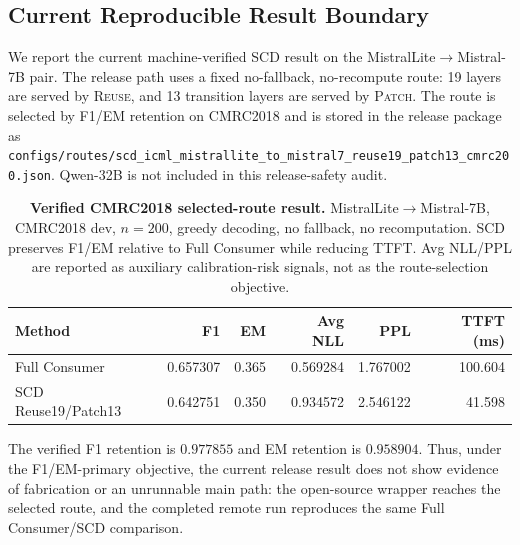
\subsection{Current Reproducible Result Boundary}
\label{subsec:current_repro_boundary}

We report the current machine-verified SCD result on the MistralLite$\to$Mistral-7B
pair.  The release path uses a fixed no-fallback, no-recompute route: 19 layers
are served by \textsc{Reuse}, and 13 transition layers are served by
\textsc{Patch}.  The route is selected by F1/EM retention on CMRC2018 and is
stored in the release package as
\texttt{configs/routes/scd\_icml\_mistrallite\_to\_mistral7\_reuse19\_patch13\_cmrc200.json}.
Qwen-32B is not included in this release-safety audit.

\begin{table}[t]
  \centering
  \small
  \caption{\textbf{Verified CMRC2018 selected-route result.}
  MistralLite$\to$Mistral-7B, CMRC2018 dev, $n=200$, greedy decoding, no
  fallback, no recomputation.  SCD preserves F1/EM relative to Full Consumer
  while reducing TTFT.  Avg NLL/PPL are reported as auxiliary calibration-risk
  signals, not as the route-selection objective.}
  \label{tab:current_cmrc_selected_route}
  \setlength{\tabcolsep}{4pt}
  \begin{tabular}{lrrrrr}
    \toprule
    \textbf{Method} & \textbf{F1} & \textbf{EM} & \textbf{Avg NLL} & \textbf{PPL} & \textbf{TTFT (ms)} \\
    \midrule
    Full Consumer & 0.657307 & 0.365 & 0.569284 & 1.767002 & 100.604 \\
    SCD Reuse19/Patch13 & 0.642751 & 0.350 & 0.934572 & 2.546122 & 41.598 \\
    \bottomrule
  \end{tabular}
\end{table}

The verified F1 retention is $0.977855$ and EM retention is $0.958904$.
Thus, under the F1/EM-primary objective, the current release result does not
show evidence of fabrication or an unrunnable main path: the open-source wrapper
reaches the selected route, and the completed remote run reproduces the same
Full Consumer/SCD comparison.

